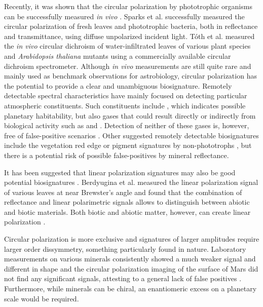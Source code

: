 \documentclass[review]{elsarticle}
\begin{document}
Recently, it was shown that the  circular polarization by phototrophic organisms can be successfully measured \textit{in vivo} \cite{Sparks2009a, Sparks2009,Toth2016}. Sparks et al. \cite{Sparks2009a, Sparks2009} successfully measured the circular polarization of fresh leaves and phototrophic bacteria, both in reflectance and transmittance, using diffuse unpolarized incident light. T{\'o}th et al. \cite{Toth2016} measured the \textit{in vivo} circular dichroism of water-infiltrated leaves of various plant species and \textit{Arabidopsis thaliana} mutants using a commercially available circular dichroism spectrometer. Although \textit{in vivo} measurements are still quite rare and mainly used as benchmark observations for astrobiology, circular polarization has the potential to provide a clear and unambiguous biosignature. Remotely detectable spectral characteristics have mainly focused on detecting particular atmospheric constituents. Such constituents include , which indicates possible planetary habitability, but also gases that could result directly or indirectly from biological activity such as  and  \cite{Kaltenegger2007, DesMarais2002}. Detection of neither of these gases is, however, free of false-positive scenarios \cite{Domagal-Goldman2014, Schwieterman2016, Harman2015, Wordsworth2014}. Other suggested remotely detectable biosignatures include the vegetation red edge \cite{Seager2005, Kiang2007} or pigment signatures by non-phototrophs \cite{Schwieterman2015}, but there is a potential risk of possible false-positives by mineral reflectance. 

It has been suggested that linear polarization signatures may also be good potential biosignatures \cite{Berdyugina2016}. Berdyugina et al. measured the linear polarization signal of various leaves at near Brewster's angle and found that the combination of reflectance and linear polarimetric signals allows to distinguish between abiotic and biotic materials. Both biotic and abiotic matter, however, can create linear polarization \cite{Shkuratov2006, West1997}.  

Circular polarization is more exclusive and signatures of larger amplitudes require larger order dissymmetry, something particularly found in nature. Laboratory measurements on various minerals consistently showed a much weaker signal and different in shape \cite{Sparks2009, Pospergelis1969} and the circular polarization imaging of the surface of Mars did not find any significant signals, attesting to a general lack of false positives \cite{Sparks2005}. Furthermore, while minerals can be chiral, an enantiomeric excess on a planetary scale would be required.  
\end{document}

